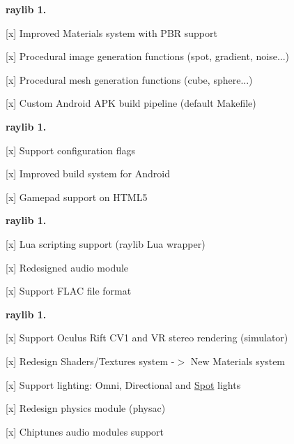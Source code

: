 {\bfseries{raylib 1.}}
\begin{DoxyItemize}
\item \mbox{[}x\mbox{]} Improved Materials system with PBR support
\item \mbox{[}x\mbox{]} Procedural image generation functions (spot, gradient, noise...)
\item \mbox{[}x\mbox{]} Procedural mesh generation functions (cube, sphere...)
\item \mbox{[}x\mbox{]} Custom Android APK build pipeline (default Makefile)
\end{DoxyItemize}

{\bfseries{raylib 1.}}
\begin{DoxyItemize}
\item \mbox{[}x\mbox{]} Support configuration flags
\item \mbox{[}x\mbox{]} Improved build system for Android
\item \mbox{[}x\mbox{]} Gamepad support on HTML5
\end{DoxyItemize}

{\bfseries{raylib 1.}}
\begin{DoxyItemize}
\item \mbox{[}x\mbox{]} Lua scripting support (raylib Lua wrapper)
\item \mbox{[}x\mbox{]} Redesigned audio module
\item \mbox{[}x\mbox{]} Support FLAC file format
\end{DoxyItemize}

{\bfseries{raylib 1.}}
\begin{DoxyItemize}
\item \mbox{[}x\mbox{]} Support Oculus Rift CV1 and VR stereo rendering (simulator)
\item \mbox{[}x\mbox{]} Redesign Shaders/\+Textures system -\/\texorpdfstring{$>$}{>} New Materials system
\item \mbox{[}x\mbox{]} Support lighting\+: Omni, Directional and \mbox{\hyperlink{structSpot}{Spot}} lights
\item \mbox{[}x\mbox{]} Redesign physics module (physac)
\item \mbox{[}x\mbox{]} Chiptunes audio modules support
\end{DoxyItemize}

